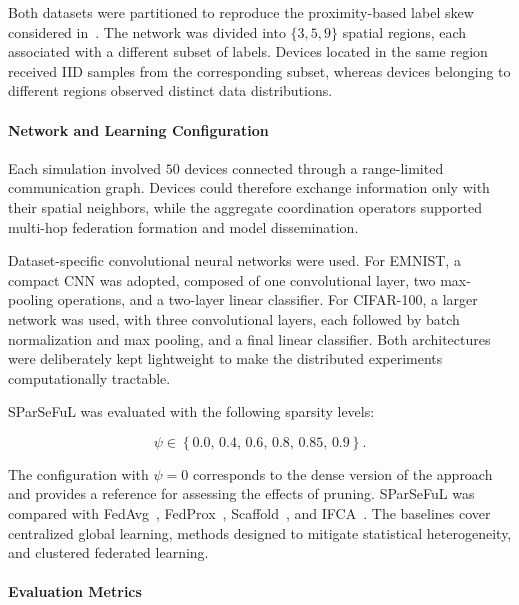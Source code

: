 Both datasets were partitioned to reproduce the proximity-based label skew
 considered in~.
%
The network was divided into \(\{3,5,9\}\) spatial regions, 
 each associated with a different subset of labels.
%
Devices located in the same region received IID samples from the corresponding subset, 
 whereas devices belonging to different regions observed distinct data distributions.

\paragraph{Network and Learning Configuration}

Each simulation involved \(50\) devices connected through 
 a range-limited communication graph.
%
Devices could therefore exchange information only with their spatial neighbors, 
 while the aggregate coordination operators supported 
 multi-hop federation formation and model dissemination.

Dataset-specific convolutional neural networks were used.
%
For EMNIST, 
 a compact CNN was adopted, composed of one convolutional layer, 
 two max-pooling operations, and a two-layer linear classifier.
%
For CIFAR-100, 
 a larger network was used, with three convolutional layers,
 each followed by batch normalization and max pooling, 
 and a final linear classifier.
%
Both architectures were deliberately kept lightweight 
 to make the distributed experiments computationally tractable.

SParSeFuL was evaluated with the following sparsity levels:

\begin{equation}
  \psi \in
  \left\{
    0.0,\,
    0.4,\,
    0.6,\,
    0.8,\,
    0.85,\,
    0.9
  \right\}.
  \label{eq:sparseful-levels}
\end{equation}

The configuration with \(\psi=0\) corresponds to the dense version 
 of the approach and provides a reference for assessing the effects of pruning.
%
SParSeFuL was compared with \gls{FedAvg}~\cite{DBLP:conf/aistats/McMahanMRHA17},
 FedProx~\cite{DBLP:conf/mlsys/LiSZSTS20},
 Scaffold~\cite{DBLP:conf/icml/KarimireddyKMRS20}, 
 and IFCA~\cite{DBLP:journals/tit/GhoshCYR22}.
%
The baselines cover centralized global learning, 
 methods designed to mitigate statistical heterogeneity, 
 and clustered federated learning.

\paragraph{Evaluation Metrics}

